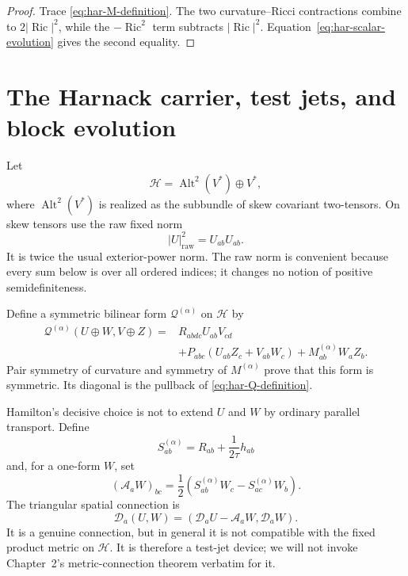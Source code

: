 \documentclass[10pt]{coll-l}
\theoremstyle{definition}
\theoremstyle{remark}
\numberwithin{section}{chapter}
\numberwithin{equation}{chapter}
\newcommand{\Ric}{\operatorname{Ric}}
\begin{document}
\begin{proof}
Trace \eqref{eq:har-M-definition}.  The two curvature--Ricci contractions
combine to $2|\Ric|^2$, while the $-\Ric^2$ term subtracts
$|\Ric|^2$.  Equation~\eqref{eq:har-scalar-evolution} gives the second
equality.
\end{proof}

\section{The Harnack carrier, test jets, and block evolution}
\label{sec:har-block-evolution}

Let
\begin{equation}
       \mathcal H=\operatorname{Alt}^2(V^*)\oplus V^*,  \label{eq:har-carrier}
\end{equation}
where $\operatorname{Alt}^2(V^*)$ is realized as the subbundle of skew
covariant two-tensors.  On skew tensors use the raw fixed norm
\begin{equation}
       |U|_{\mathrm{raw}}^2=U_{ab}U_{ab}.                \label{eq:har-raw-twoform-norm}
\end{equation}
It is twice the usual exterior-power norm.  The raw norm is convenient
because every sum below is over all ordered indices; it changes no notion of
positive semidefiniteness.

Define a symmetric bilinear form $\mathscr Q^{(\alpha)}$ on $\mathcal H$ by
\begin{equation}
 \begin{split}
 \mathscr Q^{(\alpha)}(U\oplus W,V\oplus Z)
 ={}&R_{abdc}U_{ab}V_{cd}\\
    &+P_{abc}(U_{ab}Z_c+V_{ab}W_c)
      +M^{(\alpha)}_{ab}W_aZ_b.                         \label{eq:har-polarized-Q}
 \end{split}
\end{equation}
Pair symmetry of curvature and symmetry of $M^{(\alpha)}$ prove that this
form is symmetric.  Its diagonal is the pullback of
\eqref{eq:har-Q-definition}.

Hamilton's decisive choice is not to extend $U$ and $W$ by ordinary
parallel transport.  Define
\begin{equation}
 S^{(\alpha)}_{ab}=R_{ab}+\frac1{2\tau}h_{ab}            \label{eq:har-S-definition}
\end{equation}
and, for a one-form $W$, set
\begin{equation}
 (\mathcal A_aW)_{bc}
   =\frac12(S^{(\alpha)}_{ab}W_c-S^{(\alpha)}_{ac}W_b). \label{eq:har-triangular-A}
\end{equation}
The triangular spatial connection is
\begin{equation}
 \mathscr D_a(U,W)
    =(\mathcal D_aU-\mathcal A_aW,\mathcal D_aW).        \label{eq:har-triangular-connection}
\end{equation}
It is a genuine connection, but in general it is not compatible with the
fixed product metric on $\mathcal H$.  It is therefore a test-jet device;
we will not invoke Chapter~2's metric-connection theorem verbatim for it.
\end{document}
